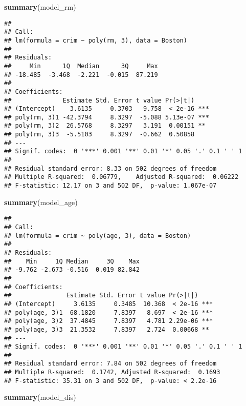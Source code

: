 \documentclass[
]{article}
\newenvironment{Shaded}{\begin{snugshade}}{\end{snugshade}}
\newcommand{\FunctionTok}[1]{\textcolor[rgb]{0.13,0.29,0.53}{\textbf{#1}}}
\newcommand{\NormalTok}[1]{#1}
\begin{document}
\begin{Shaded}
\begin{Highlighting}[]
\FunctionTok{summary}\NormalTok{(model\_rm)}
\end{Highlighting}
\end{Shaded}

\begin{verbatim}
## 
## Call:
## lm(formula = crim ~ poly(rm, 3), data = Boston)
## 
## Residuals:
##     Min      1Q  Median      3Q     Max 
## -18.485  -3.468  -2.221  -0.015  87.219 
## 
## Coefficients:
##              Estimate Std. Error t value Pr(>|t|)    
## (Intercept)    3.6135     0.3703   9.758  < 2e-16 ***
## poly(rm, 3)1 -42.3794     8.3297  -5.088 5.13e-07 ***
## poly(rm, 3)2  26.5768     8.3297   3.191  0.00151 ** 
## poly(rm, 3)3  -5.5103     8.3297  -0.662  0.50858    
## ---
## Signif. codes:  0 '***' 0.001 '**' 0.01 '*' 0.05 '.' 0.1 ' ' 1
## 
## Residual standard error: 8.33 on 502 degrees of freedom
## Multiple R-squared:  0.06779,    Adjusted R-squared:  0.06222 
## F-statistic: 12.17 on 3 and 502 DF,  p-value: 1.067e-07
\end{verbatim}

\begin{Shaded}
\begin{Highlighting}[]
\FunctionTok{summary}\NormalTok{(model\_age)}
\end{Highlighting}
\end{Shaded}

\begin{verbatim}
## 
## Call:
## lm(formula = crim ~ poly(age, 3), data = Boston)
## 
## Residuals:
##    Min     1Q Median     3Q    Max 
## -9.762 -2.673 -0.516  0.019 82.842 
## 
## Coefficients:
##               Estimate Std. Error t value Pr(>|t|)    
## (Intercept)     3.6135     0.3485  10.368  < 2e-16 ***
## poly(age, 3)1  68.1820     7.8397   8.697  < 2e-16 ***
## poly(age, 3)2  37.4845     7.8397   4.781 2.29e-06 ***
## poly(age, 3)3  21.3532     7.8397   2.724  0.00668 ** 
## ---
## Signif. codes:  0 '***' 0.001 '**' 0.01 '*' 0.05 '.' 0.1 ' ' 1
## 
## Residual standard error: 7.84 on 502 degrees of freedom
## Multiple R-squared:  0.1742, Adjusted R-squared:  0.1693 
## F-statistic: 35.31 on 3 and 502 DF,  p-value: < 2.2e-16
\end{verbatim}

\begin{Shaded}
\begin{Highlighting}[]
\FunctionTok{summary}\NormalTok{(model\_dis)}
\end{Highlighting}
\end{Shaded}
\end{document}
